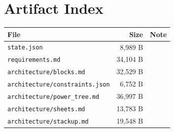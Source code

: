\documentclass[11pt,a4paper]{article}
\begin{document}
\section{Artifact Index}
{\small
\begin{longtable}{p{9cm}rp{4cm}}
\toprule
\textbf{File} & \textbf{Size} & \textbf{Note} \\
\midrule
\endhead
\texttt{state.json} & 8,989 B &  \\
\texttt{requirements.md} & 34,104 B &  \\
\texttt{architecture/blocks.md} & 32,529 B &  \\
\texttt{architecture/constraints.json} & 6,752 B &  \\
\texttt{architecture/power\_tree.md} & 36,997 B &  \\
\texttt{architecture/sheets.md} & 13,783 B &  \\
\texttt{architecture/stackup.md} & 19,548 B &  \\
\bottomrule
\end{longtable}
}
\end{document}
